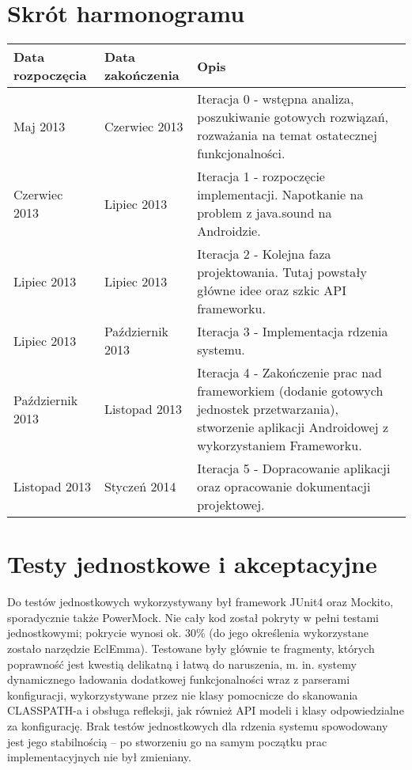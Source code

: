 \section{Skrót harmonogramu}
\begin{center}
    \begin{tabular}{| l | l | p{9cm} |}
    \hline
    Data rozpoczęcia & Data zakończenia & Opis \\ \hline
    Maj 2013 & Czerwiec 2013 & Iteracja 0 - wstępna analiza, poszukiwanie gotowych rozwiązań, rozważania na temat ostatecznej funkcjonalności. \\ \hline
    Czerwiec 2013 & Lipiec 2013 & Iteracja 1 - rozpoczęcie implementacji. Napotkanie na problem z java.sound na Androidzie. \\ \hline
    Lipiec 2013 & Lipiec 2013 & Iteracja 2 - Kolejna faza projektowania. Tutaj powstały główne idee oraz szkic API frameworku.  \\ \hline
    Lipiec 2013 & Październik 2013 & Iteracja 3 - Implementacja rdzenia systemu. \\ \hline
    Październik 2013 & Listopad 2013 & Iteracja 4 - Zakończenie prac nad frameworkiem (dodanie gotowych jednostek przetwarzania), stworzenie aplikacji Androidowej z wykorzystaniem Frameworku. \\ \hline
    Listopad 2013 & Styczeń 2014 & Iteracja 5 - Dopracowanie aplikacji oraz opracowanie dokumentacji projektowej. \\ \hline
    \end{tabular}
\end{center}
\section{Testy jednostkowe i akceptacyjne}

Do testów jednostkowych wykorzystywany był framework JUnit4 oraz Mockito, sporadycznie także
PowerMock. Nie cały kod został pokryty w pełni testami jednostkowymi; pokrycie wynosi ok. 30\% (do
jego określenia wykorzystane zostało narzędzie EclEmma). Testowane były głównie te fragmenty,
których poprawność jest kwestią delikatną i łatwą do naruszenia, m. in. systemy dynamicznego
ładowania dodatkowej funkcjonalności wraz z parserami konfiguracji, wykorzystywane przez nie klasy
pomocnicze do skanowania CLASSPATH-a i obsługa refleksji, jak również API modeli i klasy
odpowiedzialne za konfigurację. Brak testów jednostkowych dla rdzenia systemu spowodowany jest jego
stabilnością -- po stworzeniu go na samym początku prac implementacyjnych nie był zmieniany.


